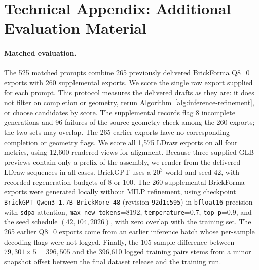 \section{Technical Appendix: Additional Evaluation Material}
\label{app:eval}

\paragraph{Matched evaluation.}
The 525 matched prompts combine 265 previously delivered BrickForma Q8\_0 exports with 260 supplemental exports. We score the single raw export supplied for each prompt. This protocol measures the delivered drafts as they are: it does not filter on completion or geometry, rerun Algorithm~\ref{alg:inference-refinement}, or choose candidates by score. The supplemental records flag 8 incomplete generations and 96 failures of the source geometry check among the 260 exports; the two sets may overlap. The 265 earlier exports have no corresponding completion or geometry flags. We score all 1,575 LDraw exports on all four metrics, using 12,600 rendered views for alignment. Because three supplied GLB previews contain only a prefix of the assembly, we render from the delivered LDraw sequences in all cases. BrickGPT uses a $20^3$ world and seed 42, with recorded regeneration budgets of 8 or 100. The 260 supplemental BrickForma exports were generated locally without MILP refinement, using checkpoint \texttt{BrickGPT-Qwen3-1.7B-BrickMore-48} (revision \texttt{92d1c595}) in \texttt{bfloat16} precision with \texttt{sdpa} attention, \texttt{max\_new\_tokens}=8192, \texttt{temperature}=0.7, \texttt{top\_p}=0.9, and the seed schedule $(42,104,2026)$, with zero overlap with the training set. The 265 earlier Q8\_0 exports come from an earlier inference batch whose per-sample decoding flags were not logged. Finally, the 105-sample difference between $79{,}301{\times}5=396{,}505$ and the 396,610 logged training pairs stems from a minor snapshot offset between the final dataset release and the training run.


